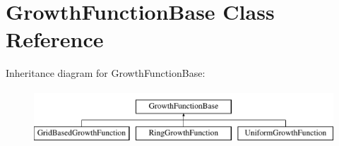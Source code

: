 \hypertarget{classGrowthFunctionBase}{}\section{Growth\+Function\+Base Class Reference}
\label{classGrowthFunctionBase}
Inheritance diagram for Growth\+Function\+Base\+:\begin{figure}[H]
\begin{center}
\leavevmode
\includegraphics[height=2.000000cm]{classGrowthFunctionBase}
\end{center}
\end{figure}
